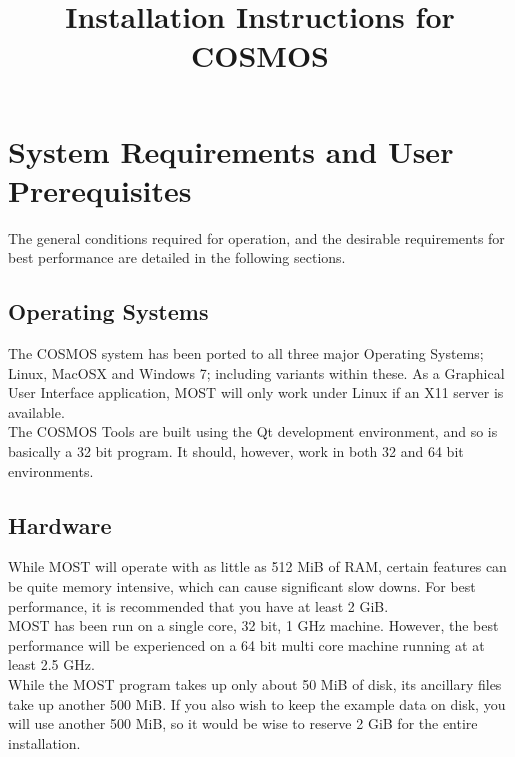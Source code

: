 \documentclass{article}
\title{Installation Instructions for COSMOS}
\begin{document}
\maketitle

\tableofcontents





\section{System Requirements and User Prerequisites}
The general conditions required for operation, and the desirable requirements for best performance are detailed in the following sections.

\subsection{Operating Systems}
The COSMOS system has been ported to all three major Operating Systems; Linux, MacOSX and Windows 7; including variants within these. As a Graphical User Interface application, MOST will only work under Linux if an X11 server is available. %
\\

The COSMOS Tools are built using the Qt development environment, and so is basically a 32 bit program. It should, however, work in both 32 and 64 bit environments.\\

\subsection{Hardware}
While MOST will operate with as little as 512 MiB of RAM, certain features
can be quite memory intensive, which can cause significant slow downs. For best performance, it is recommended that you have at least 2 GiB.
\\
MOST has been run on a single core, 32 bit, 1 GHz machine. However, the best performance will be experienced on a 64 bit multi core machine running at at least 2.5 GHz.
\\
While the MOST program takes up only about 50 MiB of disk, its ancillary files take up another 500 MiB. If you also wish to keep the example data on disk, you will use another 500 MiB, so it would be wise to reserve 2 GiB for the entire installation. %
\end{document}
